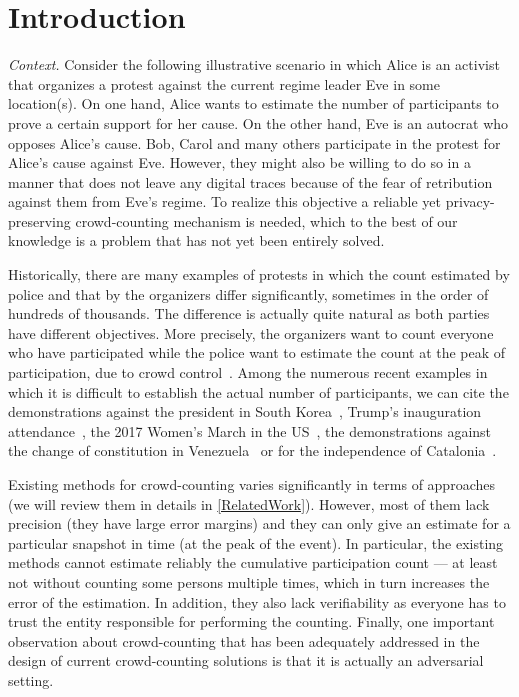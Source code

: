 \section{Introduction}%
\label{Introduction}

\emph{Context.} Consider the following illustrative scenario in which Alice is an activist that organizes a protest against the current regime leader Eve in some location(s).
On one hand, Alice wants to estimate the number of participants to prove a certain support for her cause.
On the other hand, Eve is an autocrat who opposes Alice's cause.
Bob, Carol and many others participate in the protest for Alice's cause against Eve.
However, they might also be willing to do so in a manner that does not leave any digital traces because of the fear of retribution against them from Eve's regime. 
To realize this objective a reliable yet privacy-preserving crowd-counting mechanism is needed, which to the best of our knowledge is a problem that has not yet been entirely solved.

Historically, there are many examples of protests in which the count estimated by police and that by the organizers 
differ significantly, sometimes in the order of hundreds of thousands.
The difference is actually quite natural as both parties have different objectives.
More precisely, the organizers want to count everyone who have participated while the police want to estimate the count at the peak of participation, due to crowd control~\cite{2016DemonstrationsInSeoul}.
Among the numerous recent examples in which it is difficult to establish the actual number of participants, we can cite the demonstrations against the president in South Korea~\cite{2016DemonstrationsInSeoul}, Trump's inauguration attendance~\cite{HowWillWeKnowTrumpInauguralCrowdSize}, the 2017 Women's March in the US~\cite{2017WomensMarchesInUS}, the demonstrations against the change of constitution in Venezuela~\cite{AlJazeeraOnVenezuela2017} or for the independence of Catalonia~\cite{CataloniaDemonstrations}.

Existing methods for crowd-counting varies significantly in terms of approaches (we will review them in details in \cref{RelatedWork}).
However, most of them lack precision (\ie they have large error margins) and they can only give an estimate for a particular snapshot in time (\eg at the peak of the event). 
In particular, the existing methods cannot estimate reliably the cumulative participation count --- at least not without counting some persons multiple times, which in turn increases the error of the estimation.
In addition, they also lack verifiability as everyone has to trust the entity responsible for performing the counting.
Finally, one important observation about crowd-counting that has been adequately addressed in the design of current crowd-counting solutions is that it is actually an adversarial setting. 


